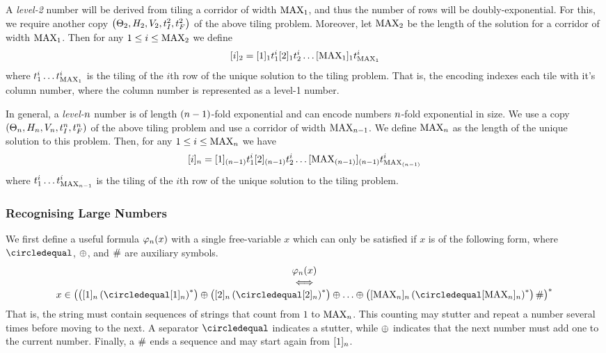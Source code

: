 A \emph{level-2} number will be derived from tiling a corridor of width $\nmax{1}$, and thus the number of rows will be doubly-exponential.
For this, we require another copy
$\tup{\tilesnum{2}, \hrelnum{2}, \vrelnum{2}, \inittilenum{2}, \fintilenum{2}}$
of the above tiling problem.
Moreover, let $\nmax{2}$ be the length of the solution for a corridor of width $\nmax{1}$.
Then for any
$1 \leq i \leq \nmax{2}$
we define
\[
    \tenc{2}{i} =
        \tenc{1}{1} \tile^i_1
        \tenc{1}{2} \tile^i_2
        \ldots
        \tenc{1}{\nmax{1}} \tile^i_{\nmax{1}}
\]
where
$\tile^i_1 \ldots \tile^i_{\nmax{1}}$
is the tiling of the $i$th row of the unique solution to the tiling problem.
That is, the encoding indexes each tile with it's column number, where the column number is represented as a level-1 number.

In general, a \emph{level-$\expheight$} number is of length $(\expheight-1)$-fold exponential and can encode numbers $\expheight$-fold exponential in size.
We use a copy
$\tup{\tilesnum{\expheight},
      \hrelnum{\expheight},
      \vrelnum{\expheight},
      \inittilenum{\expheight},
      \fintilenum{\expheight}}$
of the above tiling problem and use a corridor of width
$\nmax{\expheight-1}$.
We define $\nmax{\expheight}$ as the length of the unique solution to this problem.
Then, for any $1 \leq i \leq \nmax{\expheight}$ we have
\[
    \tenc{\expheight}{i} =
        \tenc{(\expheight-1)}{1} \tile^i_1
        \tenc{(\expheight-1)}{2} \tile^i_2
        \ldots
        \tenc{(\expheight-1)}{\nmax{(\expheight-1)}} \tile^i_{\nmax{(\expheight-1)}}
\]
where
$\tile^i_1 \ldots \tile^i_{\nmax{\expheight-1}}$
is the tiling of the $i$th row of the unique solution to the tiling problem.

\subsubsection{Recognising Large Numbers}

We first define a useful formula
$\goodnums{\expheight}{x}$
with a single free-variable $x$ which can only be satisfied if $x$ is of the following form, where
$\numeq$, $\numplus$, and $\numsep$
are auxiliary symbols.
\[
    \begin{array}{c}
        \goodnums{\expheight}{x} \\
        \iff \\
        x \in \brac{
            \brac{\tenc{\expheight}{1} \brac{\numeq \tenc{\expheight}{1}}^\ast}
            \numplus
            \brac{\tenc{\expheight}{2} \brac{\numeq \tenc{\expheight}{2}}^\ast}
            \numplus
            \ldots
            \numplus
            \brac{
                \tenc{\expheight}{\nmax{\expheight}}
                    \brac{\numeq \tenc{\expheight}{\nmax{\expheight}}}^\ast
            }
            \numsep
        }^\ast
    \end{array}
\]
That is, the string must contain sequences of strings that count from $1$ to $\nmax{\expheight}$.
This counting may stutter and repeat a number several times before moving to the next.
A separator $\numeq$ indicates a stutter, while $\numplus$ indicates that the next number must add one to the current number.
Finally, a $\numsep$ ends a sequence and may start again from $\tenc{\expheight}{1}$.


